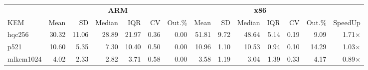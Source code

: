 \begin{table}[!ht]
\centering
\begin{tabular}{l|rrrrrr|rrrrrr|r}
\toprule
& \multicolumn{6}{c}{\bfseries ARM} & \multicolumn{6}{c}{\bfseries x86} & \\
\cmidrule(lr){2-7} \cmidrule(lr){8-13}
KEM & Mean & SD & Median & IQR & CV & Out.\% & Mean & SD & Median & IQR & CV & Out.\% & SpeedUp \\
\midrule
hqc256 & 30.32 & 11.06 & 28.89 & 21.97 & 0.36 & 0.00 & 51.81 & 9.72 & 48.64 & 5.14 & 0.19 & 9.09 & 1.71× \\
p521 & 10.60 & 5.35 & 7.30 & 10.40 & 0.50 & 0.00 & 10.96 & 1.10 & 10.53 & 0.94 & 0.10 & 14.29 & 1.03× \\
mlkem1024 & 4.02 & 2.33 & 2.82 & 3.71 & 0.58 & 0.00 & 3.58 & 1.19 & 3.04 & 1.39 & 0.33 & 4.17 & 0.89× \\
\bottomrule
\end{tabular}
\end{table}
